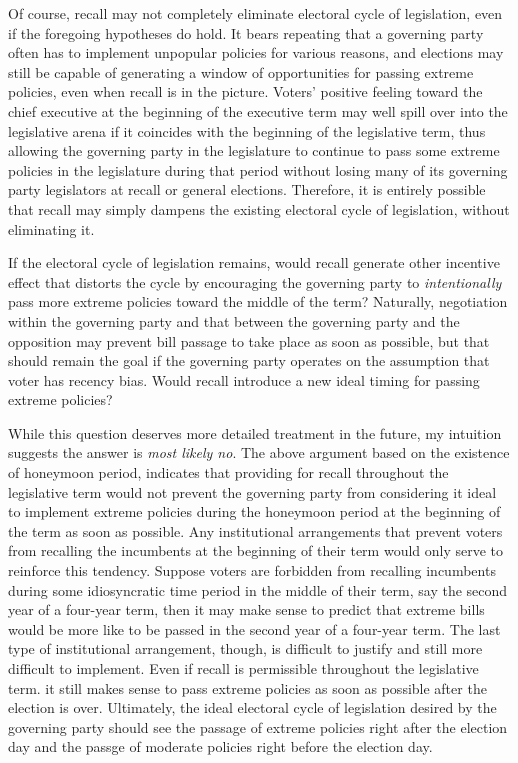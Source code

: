\documentclass{article}
\begin{document}
		Of course,
		recall may not completely eliminate electoral cycle of legislation,
		even if
		the foregoing hypotheses do hold.
		It bears repeating that a governing party
		often has to implement unpopular policies for various reasons,
		and elections may still be capable of generating
		a window of opportunities for passing extreme policies,
		even when recall is in the picture.
		Voters' positive feeling toward the chief executive
		at the beginning of the executive term
		\autocite{beckmannPolicyOpportunitiesPresidential2007,
			bondMarginalTimeVaryingEffect2003,
			castrocornejoElectionDayPresidential2022,
			dewanDynamicGovernmentPerformance2012,
			elgieProximityCandidatesPresidential2014}
		may well spill over into the legislative arena
		if it
		coincides with the beginning of the legislative term,
		thus allowing the governing party in the legislature
		to continue to pass some extreme policies in the legislature during that period
		without losing many of its governing party legislators
		at recall or general elections.
		Therefore, it is entirely possible that
		recall
		may simply dampens the existing electoral cycle of legislation,
		without eliminating it.
		
		If the electoral cycle of legislation remains,
		would recall generate other incentive effect
		that distorts the cycle by encouraging the governing party
		to \textit{intentionally} pass more extreme policies
		toward the middle of the term?
		Naturally,
		negotiation within the governing party and
		that between the governing party and the opposition
		may prevent bill passage to take place as soon as possible,
		but that should remain the goal if the governing party operates on
		the assumption that voter has recency bias.
		Would recall introduce a new ideal timing for passing extreme policies?
		
		While this question deserves
		more detailed treatment in the future,
		my intuition suggests
		the answer is \textit{most likely no}.
		The above argument based on the existence of honeymoon period,
		indicates that providing for recall throughout the legislative term
		would not prevent the governing party from
		considering it ideal to implement extreme policies
		during the honeymoon period at the beginning of the term
		as soon as possible.
		Any institutional arrangements
		that prevent voters from recalling the incumbents
		at the beginning of their term would only serve to reinforce this tendency.
		Suppose voters are forbidden from
		recalling incumbents
		during some idiosyncratic time period in the middle of their term,
		say the second year of a four-year term,
		then it may make sense to predict that
		extreme bills would be more like
		to be passed in the second year of a four-year term.
		The last type of institutional arrangement,
		though,
		is difficult to justify and still more difficult to implement.
		Even if recall is permissible throughout the legislative term.
		it still makes sense to pass extreme policies
		as soon as possible after the election is over.
		Ultimately,
		the ideal electoral cycle of legislation desired by the governing party
		should see the passage of extreme policies
		right after the election day
		and the passge of moderate policies right before the election day.
		
\end{document}
